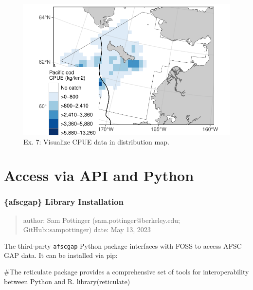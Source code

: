 \documentclass[
  letterpaper,
  oneside,
  open=any]{scrbook}
\newenvironment{Shaded}{\begin{snugshade}}{\end{snugshade}}
\newcommand{\CommentTok}[1]{\textcolor[rgb]{0.37,0.37,0.37}{#1}}
\newcommand{\FunctionTok}[1]{\textcolor[rgb]{0.28,0.35,0.67}{#1}}
\newcommand{\NormalTok}[1]{\textcolor[rgb]{0.00,0.23,0.31}{#1}}
\begin{document}
\begin{figure}[H]

{\centering \includegraphics{content/foss-api-r_files/figure-pdf/test-7-fig-1.pdf}

}

\caption{Ex. 7: Visualize CPUE data in distribution map.}

\end{figure}

\hypertarget{access-via-api-and-python}{%
\chapter{Access via API and Python}\label{access-via-api-and-python}}

\hypertarget{afscgap-library-installation}{%
\subsection{\{afscgap\} Library
Installation}\label{afscgap-library-installation}}

\begin{quote}
author: Sam Pottinger (sam.pottinger@berkeley.edu; GitHub::sampottinger)
date: May 13, 2023
\end{quote}

The third-party \texttt{afscgap} Python package interfaces with FOSS to
access AFSC GAP data. It can be installed via pip:

\begin{Shaded}
\begin{Highlighting}[]
\CommentTok{\#The reticulate package provides a comprehensive set of tools for interoperability between Python and R. }
\FunctionTok{library}\NormalTok{(reticulate)}
\end{Highlighting}
\end{Shaded}
\end{document}
